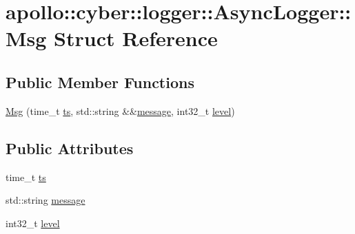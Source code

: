 \hypertarget{structapollo_1_1cyber_1_1logger_1_1AsyncLogger_1_1Msg}{\section{apollo\-:\-:cyber\-:\-:logger\-:\-:Async\-Logger\-:\-:Msg Struct Reference}
\label{structapollo_1_1cyber_1_1logger_1_1AsyncLogger_1_1Msg}
}
\subsection*{Public Member Functions}
\begin{DoxyCompactItemize}
\item 
\hyperlink{structapollo_1_1cyber_1_1logger_1_1AsyncLogger_1_1Msg_a63f56c31542f0ef19da78e550a238a9b}{Msg} (time\-\_\-t \hyperlink{structapollo_1_1cyber_1_1logger_1_1AsyncLogger_1_1Msg_a35ff514a7adda9483a8ace83ef3d88e6}{ts}, std\-::string \&\&\hyperlink{structapollo_1_1cyber_1_1logger_1_1AsyncLogger_1_1Msg_a69f346007aaf17c8cc69297fecffb5f7}{message}, int32\-\_\-t \hyperlink{structapollo_1_1cyber_1_1logger_1_1AsyncLogger_1_1Msg_a4118d2f0f6a96024b5c95eb73f743c15}{level})
\end{DoxyCompactItemize}
\subsection*{Public Attributes}
\begin{DoxyCompactItemize}
\item 
time\-\_\-t \hyperlink{structapollo_1_1cyber_1_1logger_1_1AsyncLogger_1_1Msg_a35ff514a7adda9483a8ace83ef3d88e6}{ts}
\item 
std\-::string \hyperlink{structapollo_1_1cyber_1_1logger_1_1AsyncLogger_1_1Msg_a69f346007aaf17c8cc69297fecffb5f7}{message}
\item 
int32\-\_\-t \hyperlink{structapollo_1_1cyber_1_1logger_1_1AsyncLogger_1_1Msg_a4118d2f0f6a96024b5c95eb73f743c15}{level}
\end{DoxyCompactItemize}


